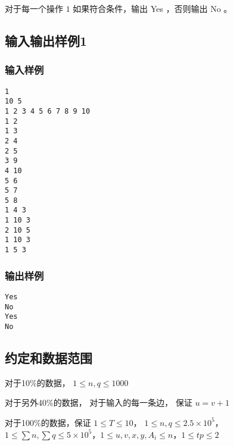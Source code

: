 \documentclass[UTF8]{ctexart}
\begin{document}
对于每一个操作 $1$ 如果符合条件，输出 Yes ，否则输出 No 。

\subsection{输入输出样例1}


\subsubsection{输入样例}

\begin{lstlisting}
1
10 5
1 2 3 4 5 6 7 8 9 10
1 2
1 3
2 4
2 5
3 9
4 10
5 6
5 7
5 8
1 4 3
1 10 3
2 10 5
1 10 3
1 5 3
\end{lstlisting}

\subsubsection{输出样例}

\begin{lstlisting}
Yes
No
Yes
No
\end{lstlisting}

\subsection{约定和数据范围}

对于10\%的数据， $1\le n,q\le 1000$

对于另外40\%的数据， 对于输入的每一条边， 保证 $u=v+1$

对于100\%的数据，保证 $1\le T\le 10$， $1\le n,q\le 2.5\times 10^5$， $1\le \sum n,\sum q\le 5\times 10^5$，$1\le u,v,x,y,A_i \le n$，$1\le tp\le 2$
\end{document}
